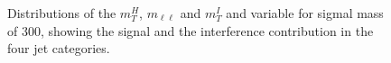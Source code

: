 \begin{figure}[htb]
\caption{
    Distributions of the  $m_T^H$, $m_{\ell \ell}$ and $m_T^I$ and  variable for sigmal mass of 300\GeV, showing the signal and the interference contribution in the four jet categories.}
    \label{fig:300}
\end{figure}




\begin{figure}[htb]
\centering
{}
\\


\end{figure}

